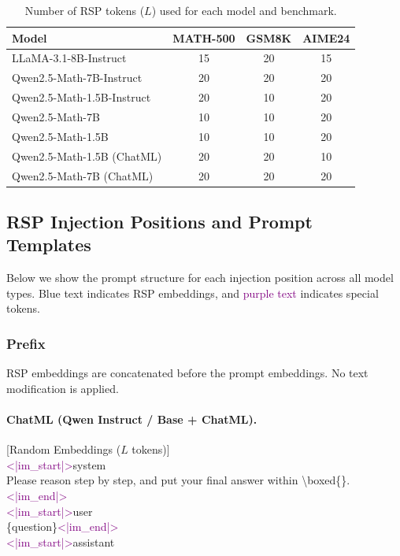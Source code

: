 \begin{table}[H]
\centering
\caption{Number of RSP tokens ($L$) used for each model and benchmark.}
\label{tab:token_count}
\footnotesize
\renewcommand{\arraystretch}{0.9}
\begin{tabular}{lccc}
\toprule
\textbf{Model} & \textbf{MATH-500} & \textbf{GSM8K} & \textbf{AIME24} \\
\midrule
LLaMA-3.1-8B-Instruct & 15 & 20 & 15 \\
Qwen2.5-Math-7B-Instruct & 20 & 20 & 20 \\
Qwen2.5-Math-1.5B-Instruct & 20 & 10 & 20 \\
Qwen2.5-Math-7B & 10 & 10 & 20 \\
Qwen2.5-Math-1.5B & 10 & 10 & 20 \\
Qwen2.5-Math-1.5B (ChatML) & 20 & 20 & 10 \\
Qwen2.5-Math-7B (ChatML) & 20 & 20 & 20 \\
\bottomrule
\end{tabular}
\end{table}

\subsection{RSP Injection Positions and Prompt Templates}\label{app:injection_positions}

Below we show the prompt structure for each injection position across all model types. \textcolor{blue!70!black}{Blue text} indicates RSP embeddings, and \textcolor{purple}{purple text} indicates special tokens.

\subsubsection{Prefix}

RSP embeddings are concatenated before the prompt embeddings. No text modification is applied.

\paragraph{ChatML (Qwen Instruct / Base + ChatML).}
\begin{tcolorbox}[colback=gray!5, colframe=black!60, arc=3pt, boxrule=0.5pt, fontupper=\footnotesize\ttfamily, breakable]
\textcolor{blue!70!black}{[Random Embeddings ($L$ tokens)]}\\
\textcolor{purple}{<|im\_start|>}system\\
Please reason step by step, and put your final answer within \textbackslash boxed\{\}.\textcolor{purple}{<|im\_end|>}\\
\textcolor{purple}{<|im\_start|>}user\\
\{question\}\textcolor{purple}{<|im\_end|>}\\
\textcolor{purple}{<|im\_start|>}assistant
\end{tcolorbox}

